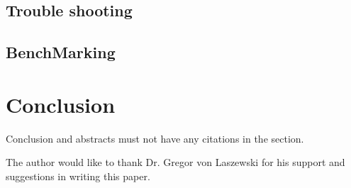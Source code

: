 \subsection{Trouble shooting}

\subsection{BenchMarking}


\section{Conclusion}

 Conclusion and abstracts must not have any
citations in the section.


\begin{acks}
The author would like to thank Dr. Gregor von Laszewski for his support and 
suggestions in writing this paper.
\end{acks}






